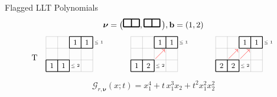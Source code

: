 \documentclass[dvipsnames]{beamer}
\newcommand{\Gcal}{{\mathcal G}}
\newcommand{\nubold}{{\boldsymbol \nu }}
\newcommand{\bb}{{\mathbf b}}
\theoremstyle{definition}
\newcounter{c}
\begin{document}
\begin{frame}[fragile]{Flagged LLT Polynomials}
\begin{equation*}
\nubold =  \big(
\begin{tikzpicture}[scale = .34]
\draw[very thick] (0,0) grid (2,1);
\end{tikzpicture}
,
\begin{tikzpicture}[scale = .34]
\draw[very thick] (0,0) grid (2,1);
\end{tikzpicture}
\, \big), \bb = (1,2)
\end{equation*}
\vspace{0.2in}
\[
\begin{array}{cc@{\quad\quad\quad}c@{\quad\quad\quad}c}
\raisebox{5mm}{T}&
\begin{tikzpicture}[scale = .5]
\begin{scope}
\draw[help lines] (0,0) grid (4,3);
\draw[thick] (0,0) grid (2,1);
\draw[thick] (2,2) grid (4,3);
\node at (0.5, 0.5) {\small $1$};
\node at (1.5, 0.5) {\small $1$};
\node at (2.5, 2.5) {\small $1$};
\node at (3.5, 2.5) {\small $1$};
\node at (2.5, 0.5) {\tiny $\leq 2$};
\node at (4.5, 2.5) {\tiny $\leq 1$};
\end{scope}
\end{tikzpicture}
&
\begin{tikzpicture}[scale = .5]
\begin{scope}
\tikzstyle{rededge} = [draw, ->,red]
\draw[help lines] (0,0) grid (4,3);
\draw[thick] (0,0) grid (2,1);
\draw[thick] (2,2) grid (4,3);
\node at (0.5, 0.5) {\small $1$};
\node at (1.5, 0.5) {\small $2$};
\node at (2.5, 2.5) {\small $1$};
\node at (3.5, 2.5) {\small $1$};
\node at (2.5, 0.5) {\tiny $\leq 2$};
\node at (4.5, 2.5) {\tiny $\leq 1$};
\draw[rededge] (2+.1,1+0.1) to (3-.1,2-.1);
\end{scope}
\end{tikzpicture}
&
\begin{tikzpicture}[scale = .5]
\tikzstyle{rededge} = [draw, ->,red]
\begin{scope}
\draw[help lines] (0,0) grid (4,3);
\draw[thick] (0,0) grid (2,1);
\draw[thick] (2,2) grid (4,3);
\node at (0.5, 0.5) {\small $2$};
\node at (1.5, 0.5) {\small $2$};
\node at (2.5, 2.5) {\small $1$};
\node at (3.5, 2.5) {\small $1$};
\node at (2.5, 0.5) {\tiny $\leq 2$};
\node at (4.5, 2.5) {\tiny $\leq 1$};
\draw[rededge] (2+.1,1+0.1) to (3-.1,2-.1);
\draw[rededge] (1+.1,1+0.1) to (2-.1,2-.1);
\end{scope}
\end{tikzpicture}
\end{array}
\]
\[
\Gcal_{r, \nubold}(x;t) = x_1^4+ t\, x_1^3x_2 + t^2 x_1^2x_2^2
\]
\end{frame}
\end{document}

